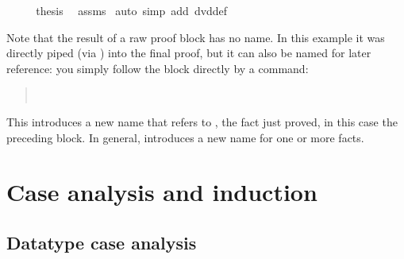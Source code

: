 \begin{isabellebody}
\isanewline
\ \ \isamarkupfalse%
\ \isamarkupfalse%
\ {}thesis\ \isamarkupfalse%
\ assms\ \isamarkupfalse%
{}auto\ simp\ add{}\ dvd{}def{}\isanewline
{}\isamarkupfalse%
%
\endisatagproof
{\isafoldproof}%
%
\isadelimproof
%
\endisadelimproof
%
\begin{isamarkuptext}%
Note that the result of a raw proof block has no name. In this example
it was directly piped (via ) into the final proof, but it can
also be named for later reference: you simply follow the block directly by a
 command:
\begin{quote}
 \ 
\end{quote}
This introduces a new name  that refers to ,
the fact just proved, in this case the preceding block. In general,
 introduces a new name for one or more facts.

\section{Case analysis and induction}

\subsection{Datatype case analysis}


\end{isamarkuptext}
\end{isabellebody}
